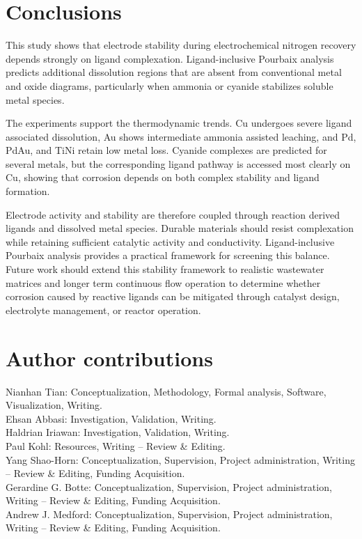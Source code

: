\documentclass[twoside,twocolumn,9pt]{article}
\begin{document}
\section*{Conclusions}
This study shows that electrode stability during electrochemical nitrogen recovery depends strongly on ligand complexation. Ligand-inclusive Pourbaix analysis predicts additional dissolution regions that are absent from conventional metal and oxide diagrams, particularly when ammonia or cyanide stabilizes soluble metal species.

The experiments support the thermodynamic trends. Cu undergoes severe ligand associated dissolution, Au shows intermediate ammonia assisted leaching, and Pd, PdAu, and TiNi retain low metal loss. Cyanide complexes are predicted for several metals, but the corresponding ligand pathway is accessed most clearly on Cu, showing that corrosion depends on both complex stability and ligand formation.

Electrode activity and stability are therefore coupled through reaction derived ligands and dissolved metal species. Durable materials should resist complexation while retaining sufficient catalytic activity and conductivity. Ligand-inclusive Pourbaix analysis provides a practical framework for screening this balance. Future work should extend this stability framework to realistic wastewater matrices and longer term continuous flow operation to determine whether corrosion caused by reactive ligands can be mitigated through catalyst design, electrolyte management, or reactor operation.







\section*{Author contributions}
Nianhan Tian: Conceptualization, Methodology, Formal analysis, Software, Visualization, Writing.  \\
Ehsan Abbasi: Investigation, Validation, Writing.  \\
Haldrian Iriawan: Investigation, Validation, Writing.  \\
Paul Kohl: Resources, Writing -- Review \& Editing.  \\
Yang Shao-Horn: Conceptualization, Supervision, Project administration, Writing -- Review \& Editing, Funding Acquisition.  \\
Gerardine G. Botte: Conceptualization, Supervision, Project administration, Writing -- Review \& Editing, Funding Acquisition.  \\
Andrew J. Medford: Conceptualization, Supervision, Project administration, Writing -- Review \& Editing, Funding Acquisition. \\
\end{document}
